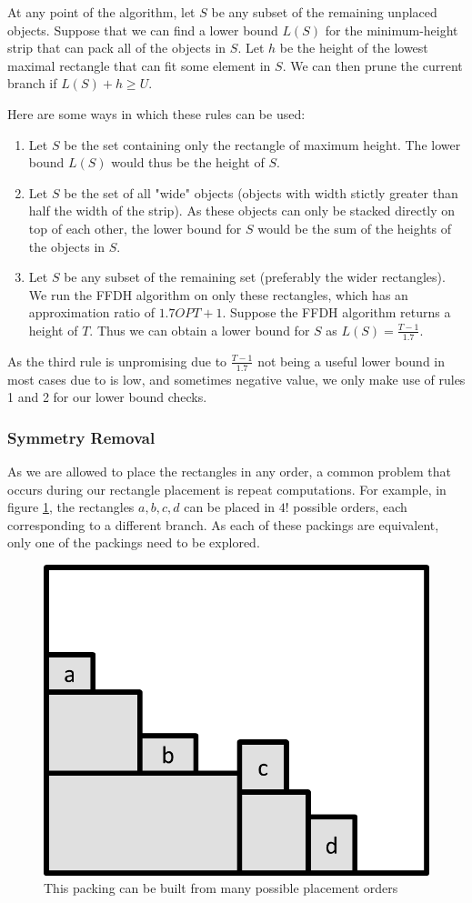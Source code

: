 \documentclass{article}
\begin{document}
At any point of the algorithm, let $S$ be any subset of the remaining unplaced objects. Suppose that we can find a lower bound $L(S)$ for the minimum-height strip that can pack all of the objects in $S$. Let $h$ be the height of the lowest maximal rectangle that can fit some element in $S$. We can then prune the current branch if $L(S) + h \geq U$.

Here are some ways in which these rules can be used:
\begin{enumerate}
\item Let $S$ be the set containing only the rectangle of maximum height. The lower bound $L(S)$ would thus be the height of $S$.

\item Let $S$ be the set of all "wide" objects (objects with width stictly greater than half the width of the strip). As these objects can only be stacked directly on top of each other, the lower bound for $S$ would be the sum of the heights of the objects in $S$.

\item Let $S$ be any subset of the remaining set (preferably the wider rectangles). We run the FFDH algorithm on only these rectangles, which has an approximation ratio of $1.7OPT + 1$. Suppose the FFDH algorithm returns a height of $T$. Thus we can obtain a lower bound for $S$ as $L(S) = \frac{T - 1}{1.7}$.
\end{enumerate}

As the third rule is unpromising due to $\frac{T-1}{1.7}$ not being a useful lower bound in most cases due to is low, and sometimes negative value, we only make use of rules 1 and 2 for our lower bound checks.


\subsubsection{Symmetry Removal}
As we are allowed to place the rectangles in any order, a common problem that occurs during our rectangle placement is repeat computations. For example, in figure \ref{fig:repeatplacements}, the rectangles $a,b,c,d$ can be placed in $4!$ possible orders, each corresponding to a different branch. As each of these packings are equivalent, only one of the packings need to be explored.\\ 

\begin{figure}[!h]
  \centering
  \includegraphics[width=.4\linewidth]{diagrams/repeatplacements.png}
  \caption{This packing can be built from many possible placement orders}
  \label{fig:repeatplacements}
\end{figure}
\end{document}
